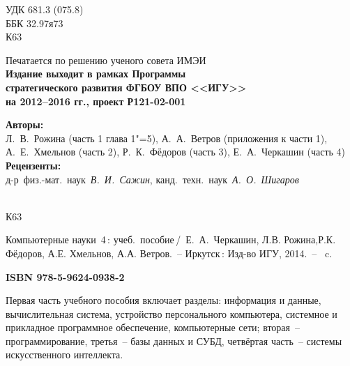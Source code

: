 \documentclass[a4paper,14pt, openany, twoside, final]{extbook} %
\begin{document}
\newpage
\begin{mygroup}
\thispagestyle{empty}
\noindent УДК 681.3 (075.8)\\ %
\noindent ББК 32.97я73\\
\noindent\mbox{}\hspace{2em}К63
\begin{center}\small
Печатается по решению ученого совета ИМЭИ\\[2ex]
\bfseries Издание выходит в рамках Программы\\
стратегического развития ФГБОУ ВПО <<ИГУ>>\\
на 2012--2016 гг., проект Р121-02-001
\end{center}
\vspace{0.5ex}
\begin{center}\small
  \textbf{Авторы:}\\
  Л.~В.~Рожина (часть 1 глава 1"=5), А.~А.~Ветров (приложения к части 1),\\
  А.~Е.~Хмельнов (часть 2), Р.~К.~Фёдоров (часть 3), Е.~А.~Черкашин (часть 4)
  \textbf{Рецензенты:} \\
  д-р~физ.-мат.~наук~{\em В.~И.~Сажин}, канд.~техн.~наук~{\em А.~О.~Шигаров}\\
\end{center}
\vfill
\noindent\begin{minipage}[t]{2em}
\noindent\mbox{}\\
К63
\end{minipage}%
\begin{minipage}[t]{0.95\linewidth}
\setlength{\parindent}{5ex}

Компьютерные науки~4\,{}: учеб.~пособие\,/~Е.~А.~Черкашин, Л.В. Рожина,Р.К. Фёдоров, А.Е. Хмельнов, А.А. Ветров.~-- Иркутск\,: Изд-во ИГУ, 2014.~-- \pageref{lastpage}~c.

{\bfseries ISBN 978-5-9624-0938-2}
\vspace{2ex}

\begingroup\footnotesize\parskip0pt
\vspace{1ex}


Первая часть учебного пособия включает разделы: информация и данные, вычислительная система, устройство персонального компьютера, системное и прикладное программное обеспечение, компьютерные сети; вторая~--  программирование, третья~-- базы данных и СУБД, четвёртая часть~-- системы искусственного интеллекта.


\end{minipage}
\end{mygroup}
\end{document}
